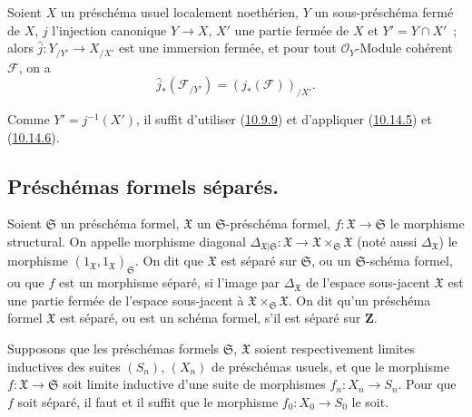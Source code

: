 \begin{corollary}[10.14.7]
\label{I.10.14.7-fr}
Soient $X$ un préschéma usuel localement noethérien, $Y$ un sous-préschéma
fermé de $X$, $j$ l'injection canonique $Y\to X$, $X'$ une partie fermée de
$X$ et $Y'=Y\cap X'$~; alors
$\widehat{j}:Y_{/Y'}\to X_{/X'}$ est une immersion fermée, et pour tout
$\mathscr{O}_Y$-Module cohérent $\mathscr{F}$, on a
\[
  \widehat{j}_*(\mathscr{F}_{/Y'})=(j_*(\mathscr{F}))_{/X'}.
\]
\end{corollary}

Comme $Y'=j^{-1}(X')$, il suffit d'utiliser
(\hyperref[I.10.9.9-fr]{10.9.9}) et d'appliquer
(\hyperref[I.10.14.5-fr]{10.14.5}) et
(\hyperref[I.10.14.6-fr]{10.14.6}).

\subsection{Préschémas formels séparés.}
\label{subsection:I.10.15-fr}

\begin{definition}[10.15.1]
\label{I.10.15.1-fr}
Soient $\mathfrak{S}$ un préschéma formel, $\mathfrak{X}$ un
$\mathfrak{S}$-préschéma formel,
$f:\mathfrak{X}\to\mathfrak{S}$ le morphisme structural. On appelle
morphisme diagonal
$\Delta_{\mathfrak{X}|\mathfrak{S}}:\mathfrak{X}\to
\mathfrak{X}\times_{\mathfrak{S}}\mathfrak{X}$ (noté aussi
$\Delta_{\mathfrak{X}}$) le morphisme
$(1_{\mathfrak{X}},1_{\mathfrak{X}})_{\mathfrak{S}}$. On dit que
$\mathfrak{X}$ est séparé sur $\mathfrak{S}$, ou un
$\mathfrak{S}$-schéma formel, ou que $f$ est un morphisme séparé, si l'image
par $\Delta_{\mathfrak{X}}$ de l'espace sous-jacent $\mathfrak{X}$ est une
partie fermée de l'espace sous-jacent à
$\mathfrak{X}\times_{\mathfrak{S}}\mathfrak{X}$. On dit qu'un préschéma
formel $\mathfrak{X}$ est séparé, ou est un schéma formel, s'il est séparé
sur $\mathbf{Z}$.
\end{definition}

\begin{proposition}[10.15.2]
\label{I.10.15.2-fr}
Supposons que les préschémas formels $\mathfrak{S}$, $\mathfrak{X}$ soient
respectivement limites inductives des suites $(S_n)$, $(X_n)$ de
préschémas usuels, et que le morphisme
$f:\mathfrak{X}\to\mathfrak{S}$ soit limite inductive d'une suite de
morphismes $f_n:X_n\to S_n$. Pour que $f$ soit séparé, il faut et il suffit
que le morphisme $f_0:X_0\to S_0$ le soit.
\end{proposition}

